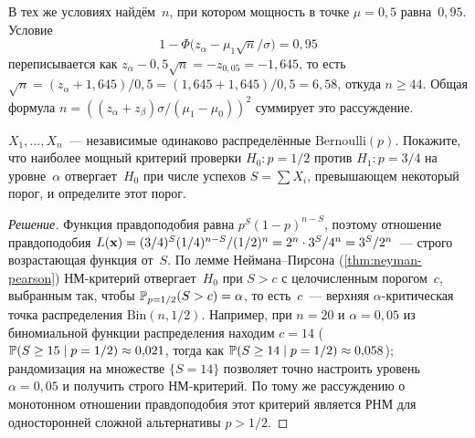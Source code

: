\begin{example}
\label{ex:sample-size}
В тех же условиях найдём~$n$, при котором мощность в точке $\mu = 0{,}5$ равна~$0{,}95$. Условие
\[
  1 - \Phi\bigl(z_\alpha - \mu_1 \sqrt n / \sigma\bigr) = 0{,}95
\]
переписывается как $z_\alpha - 0{,}5 \sqrt n = -z_{0{,}05} = -1{,}645$, то есть $\sqrt n = (z_\alpha + 1{,}645)/0{,}5 = (1{,}645 + 1{,}645)/0{,}5 = 6{,}58$, откуда $n \geq 44$. Общая формула $n = ((z_\alpha + z_\beta)\sigma/(\mu_1 - \mu_0))^2$ суммирует это рассуждение.
\end{example}

\begin{problem}
\label{prob:bernoulli-test}
$X_1, \dots, X_n$~--- независимые одинаково распределённые $\mathrm{Bernoulli}(p)$. Покажите, что наиболее мощный критерий проверки $H_0 : p = 1/2$ против $H_1 : p = 3/4$ на уровне~$\alpha$ отвергает~$H_0$ при числе успехов $S = \sum X_i$, превышающем некоторый порог, и определите этот порог.
\end{problem}

\begin{proof}[Решение]
Функция правдоподобия равна $p^S (1 - p)^{n - S}$, поэтому отношение правдоподобия $L(\mathbf{x}) = (3/4)^S (1/4)^{n - S} / (1/2)^n = 2^n \cdot 3^S / 4^n = 3^S / 2^n$~--- строго возрастающая функция от~$S$. По лемме Неймана--Пирсона (\cref{thm:neyman-pearson}) НМ-критерий отвергает~$H_0$ при $S > c$ с целочисленным порогом~$c$, выбранным так, чтобы $\mathbb{P}_{p = 1/2}(S > c) = \alpha$, то есть~$c$~--- верхняя $\alpha$-критическая точка распределения $\mathrm{Bin}(n, 1/2)$. Например, при $n = 20$ и $\alpha = 0{,}05$ из биномиальной функции распределения находим $c = 14$ ($\mathbb{P}(S \geq 15 \mid p = 1/2) \approx 0{,}021$, тогда как $\mathbb{P}(S \geq 14 \mid p = 1/2) \approx 0{,}058$); рандомизация на множестве $\{S = 14\}$ позволяет точно настроить уровень $\alpha = 0{,}05$ и получить строго НМ-критерий. По тому же рассуждению о монотонном отношении правдоподобия этот критерий является РНМ для односторонней сложной альтернативы $p > 1/2$.
\end{proof}

